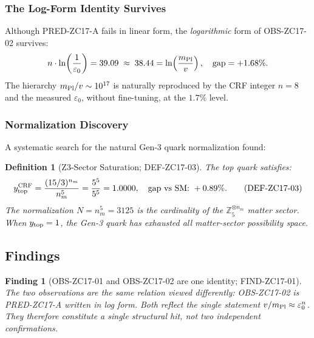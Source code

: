 \documentclass[12pt, a4paper]{article}
\newtheorem{definition}{Definition}[section]
\newtheorem{finding}{Finding}[section]
\begin{document}
\subsubsection{The Log-Form Identity Survives}

Although PRED-ZC17-A fails in linear form, the
\emph{logarithmic} form of OBS-ZC17-02 survives:
\begin{equation}
  n\cdot\ln\!\left(\frac{1}{\varepsilon_0}\right)
  = 39.09
  \;\approx\; 38.44
  = \ln\!\left(\frac{m_{\rm Pl}}{v}\right),
  \quad \text{gap} = +1.68\%.
  \label{zc17:eq:log-survives}
\end{equation}
The hierarchy $m_{\rm Pl}/v\sim10^{17}$ is naturally reproduced
by the CRF integer $n=8$ and the measured $\varepsilon_0$,
without fine-tuning, at the $1.7\%$ level.

\subsubsection{Normalization Discovery}

A systematic search for the natural Gen-3 quark normalization
found:

\begin{definition}[Z3-Sector Saturation; DEF-ZC17-03]
\label{zc17:def:z3-sat}
The top quark satisfies:
\begin{equation}
  y_{\rm top}^{\rm CRF}
  = \frac{(15/3)^{n_m}}{n_m^5}
  = \frac{5^5}{5^5}
  = 1.0000,
  \quad \text{gap vs SM:\ } +0.89\%.
  \tag{DEF-ZC17-03}\label{zc17:eq:ytop}
\end{equation}
The normalization $N = n_m^5 = 3125$ is the cardinality of
the $\mathbb{Z}_5^{\otimes n_m}$ matter sector. When
$y_{\rm top}=1$, the Gen-3 quark has exhausted all
matter-sector possibility space.
\end{definition}

\subsection{Findings}
\label{zc17:sec:findings}

\begin{finding}[OBS-ZC17-01 and OBS-ZC17-02 are one identity;
  FIND-ZC17-01]
\label{zc17:find:one-identity}
The two observations are the same relation viewed differently:
OBS-ZC17-02 is PRED-ZC17-A written in log form.
Both reflect the single statement $v/m_{\rm Pl}\approx\varepsilon_0^n$.
They therefore constitute a single structural hit,
not two independent confirmations.
\end{finding}
\end{document}
